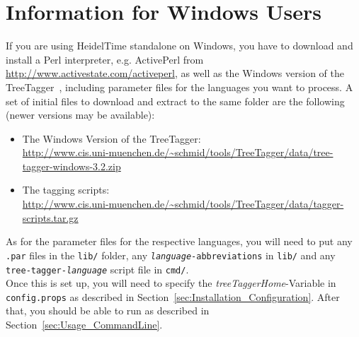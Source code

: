 \appendix
\section{Information for Windows Users}\label{app:windows}
If you are using HeidelTime standalone on Windows, you have to download and install a Perl interpreter, e.g. ActivePerl from \url{http://www.activestate.com/activeperl}, as well as the Windows version of the TreeTagger~\cite{Schmid1994}, including parameter files for the languages you want to process. A set of initial files to download and extract to the same folder are the following (newer versions may be available):
\begin{itemize}
  \item The Windows Version of the TreeTagger: \\
    \url{http://www.cis.uni-muenchen.de/~schmid/tools/TreeTagger/data/tree-tagger-windows-3.2.zip}
  \item The tagging scripts: \\
    \url{http://www.cis.uni-muenchen.de/~schmid/tools/TreeTagger/data/tagger-scripts.tar.gz}
\end{itemize}

As for the parameter files for the respective languages, you will need to put any \texttt{.par} files in the \texttt{lib/} folder, any \texttt{\textit{language}-abbreviations} in \texttt{lib/} and any \texttt{tree-tagger-\textit{language}} script file in \texttt{cmd/}. \\

Once this is set up, you will need to specify the \textit{treeTaggerHome}-Variable in \texttt{config.props} as described in Section~\ref{sec:Installation_Configuration}. After that, you should be able to run \product{} as described in Section~\ref{sec:Usage_CommandLine}.